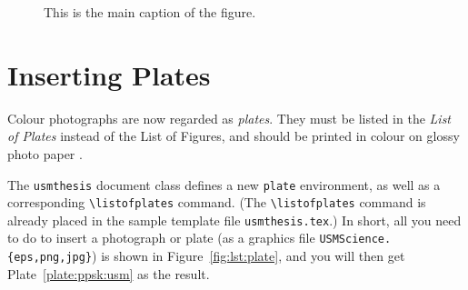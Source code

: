 \begin{figure}[hbt!]
  \begin{minipage}{.49\textwidth}
  \centering
   \label{fig:sub1}
  \end{minipage}
  \hfill
  \begin{minipage}{.49\textwidth}
  \label{fig:sub2}
  \end{minipage}

  \caption{This is the main caption of the figure.}
  \label{fig:main}
\end{figure}

\section{Inserting Plates}\label{sec:plate}

Colour photographs are now regarded as \emph{plates}. They must be listed in the \emph{List of Plates} instead of the List of Figures, and should be printed in colour on glossy photo paper \citep{ips:thesis:guideline:2007}.

The \texttt{usmthesis} document class defines a new \texttt{plate} environment, as well as a corresponding \verb|\listofplates| command.  (The \verb|\listofplates| command is already placed in the sample template file \verb|usmthesis.tex|.)  In short, all you need to do to insert a photograph or plate (as a graphics file \verb|USMScience.{eps,png,jpg}|) is shown in Figure~\ref{fig:lst:plate}, and you will then get Plate~\ref{plate:ppsk:usm} as the result.


